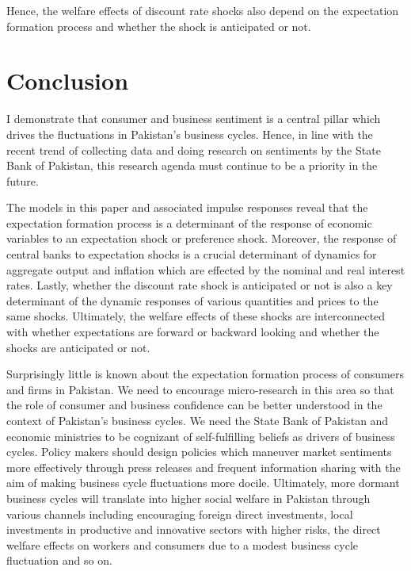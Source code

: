 \documentclass[12pt]{article}
\newcommand{\1}{\mathbbm 1}
\begin{document}
Hence, the welfare effects of discount rate shocks also depend on the expectation formation process and whether the shock is anticipated or not.













		
		\newpage
		
		\section{Conclusion}
		
		I demonstrate that consumer and business sentiment is a central pillar which drives the fluctuations in Pakistan's business cycles. Hence, in line with the recent trend of collecting data and doing research on sentiments by the State Bank of Pakistan, this research agenda must continue to be a priority in the future.
		
		
		The models in this paper and associated impulse responses reveal that the expectation formation process is a determinant of the response of economic variables to an expectation shock or preference shock. Moreover, the response of central banks to expectation shocks is a crucial determinant of dynamics for aggregate output and inflation which are effected by the nominal and real interest rates. Lastly, whether the discount rate shock is anticipated or not is also a key determinant of the dynamic responses of various quantities and prices to the same shocks. Ultimately, the welfare effects of these shocks are interconnected with whether expectations are forward or backward looking and whether the shocks are anticipated or not.
		
		
		Surprisingly little is known about the expectation formation process of consumers and firms in Pakistan. We need to encourage micro-research in this area so that the role of consumer and business confidence can be better understood in the context of Pakistan's business cycles. We need the State Bank of Pakistan and economic ministries to be cognizant of self-fulfilling beliefs as drivers of business cycles. Policy makers should design policies which maneuver market sentiments more effectively through press releases and frequent information sharing with the aim of making business cycle fluctuations more docile. Ultimately, more dormant business cycles will translate into higher social welfare in Pakistan through various channels including encouraging foreign direct investments, local investments in productive and innovative sectors with higher risks, the direct welfare effects on workers and consumers due to a modest business cycle fluctuation and so on.
		
\end{document}
